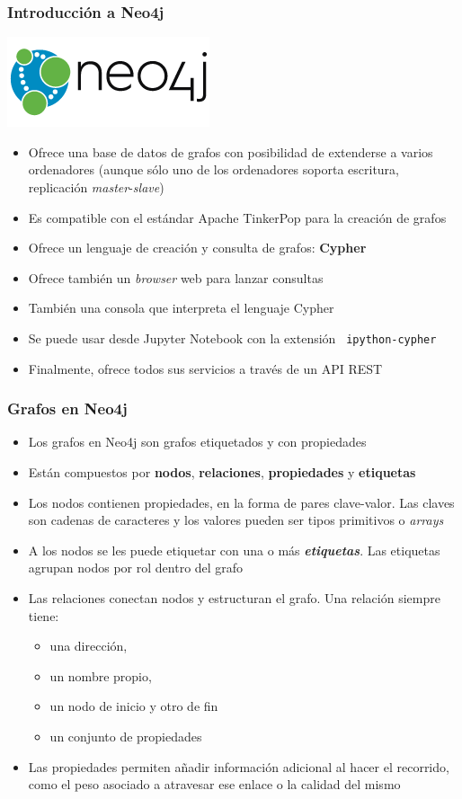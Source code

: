 \documentclass[14pt]{beamer}
\begin{document}
\begin{frame}[allowframebreaks]
  \frametitle{Introducción a Neo4j}
\centering\includegraphics[width=.4\textwidth]{img/neo4j-logo-2015}
  \begin{itemize}
\item Ofrece una base de datos de grafos con posibilidad de extenderse a
  varios ordenadores (aunque sólo uno de los ordenadores soporta escritura,
  replicación {\em master}-{\em slave})
\item Es compatible con el estándar Apache TinkerPop para la creación de
  grafos
\item Ofrece un lenguaje de creación y consulta de grafos: {\bf Cypher}
\item Ofrece también un {\em browser\/} web para lanzar consultas
\item También una consola que interpreta el lenguaje Cypher
\item Se puede usar desde Jupyter Notebook con la extensión {\tt
    ipython-cypher}
\item Finalmente, ofrece todos sus servicios a través de un API REST
  \end{itemize}
\end{frame}

\begin{frame}[allowframebreaks]
  \frametitle{Grafos en Neo4j}
  \begin{itemize}
  \item Los grafos en Neo4j son grafos etiquetados y con propiedades
  \item Están compuestos por {\bf nodos}, {\bf relaciones}, {\bf
      propiedades} y {\bf etiquetas}
\item Los nodos contienen propiedades, en la forma de pares clave-valor.
  Las claves son cadenas de caracteres y los valores pueden ser tipos
  primitivos o {\em arrays}
\item A los nodos se les puede etiquetar con una o más {\bfseries\itshape
    etiquetas}. Las etiquetas agrupan nodos por rol dentro del grafo
\item Las relaciones conectan nodos y estructuran el grafo. Una relación
  siempre tiene:
  \begin{itemize}
  \item una dirección,
  \item un nombre propio,
  \item un nodo de inicio y otro de fin
  \item un conjunto de propiedades
  \end{itemize}
\item Las propiedades permiten añadir información adicional al hacer el
  recorrido, como el peso asociado a atravesar ese enlace o la calidad del
  mismo
  \end{itemize}
\end{frame}
\end{document}
